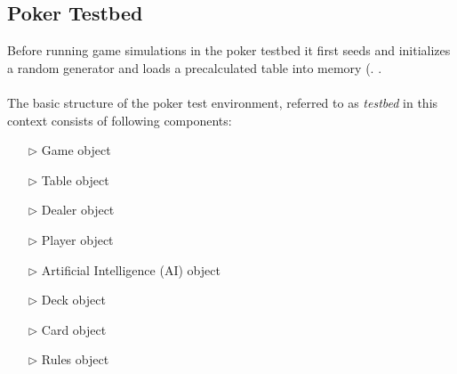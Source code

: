 \subsection{Poker Testbed}
Before running game simulations in the poker testbed it first seeds and initializes a random generator  and loads a precalculated table into memory (. .\\\\
The basic structure of the poker test environment, referred to as \textit{testbed} in this context consists of following components:\\
\pagebreak
\begin{multicols}{2}
\begin{itemize}
\item[$\triangleright$] Game object
\item[$\triangleright$] Table object
\item[$\triangleright$] Dealer object
\item[$\triangleright$] Player object
\end{itemize}
\columnbreak
\begin{itemize}
\item[$\triangleright$] Artificial Intelligence (AI) object
\item[$\triangleright$] Deck object
\item[$\triangleright$] Card object
\item[$\triangleright$] Rules object
\end{itemize}
\end{multicols}

